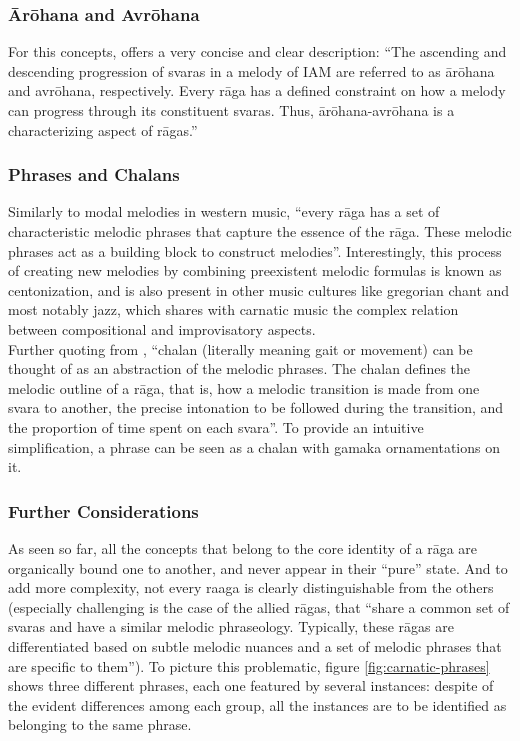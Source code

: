 \subsubsection{\=Ar\=ohana and Avr\=ohana}

For this concepts, \cite[p.19]{gulati} offers a very concise and clear description: ``The ascending and descending progression of svaras in a melody of IAM are referred to as \=ar\=ohana and avr\=ohana, respectively. Every r\=aga has a defined constraint on how a melody can progress through its constituent svaras. Thus, \=ar\=ohana-avr\=ohana is a characterizing aspect of r\=agas.''

\subsubsection{Phrases and Chalans}

Similarly to modal melodies in western music, ``every rāga has a set of characteristic melodic phrases that capture the essence of the rāga. These melodic phrases act as a building block to construct melodies''\cite[p.19]{gulati}. Interestingly, this process of creating new melodies by combining preexistent melodic formulas is known as centonization\cite[ch.III]{hoppin}, and is also present in other music cultures like gregorian chant and most notably jazz, which shares with carnatic music the complex relation between compositional and improvisatory aspects.\\

Further quoting from \cite[p.21]{gulati}, ``chalan (literally meaning gait or movement) can be thought of as an abstraction of the melodic phrases. The chalan defines the melodic outline of a rāga, that is, how a melodic transition is made from one svara to another, the precise intonation to be followed during the transition, and the proportion of time spent on each svara''. To provide an intuitive simplification, a phrase can be seen as a chalan with gamaka ornamentations on it.

\subsubsection{Further Considerations}

As seen so far, all the concepts that belong to the core identity of a r\=aga are organically bound one to another, and never appear in their ``pure'' state. And to add more complexity, not every raaga is clearly distinguishable from the others (especially challenging is the case of the allied r\=agas, that ``share a common set of svaras and have a similar melodic phraseology. Typically, these rāgas are differentiated based on subtle melodic nuances and a set of melodic phrases that are specific to them''\cite[p.21]{gulati}). To picture this problematic, figure \ref{fig:carnatic-phrases} shows three different phrases, each one featured by several instances: despite of the evident differences among each group, all the instances are to be identified as belonging to the same phrase.\\

